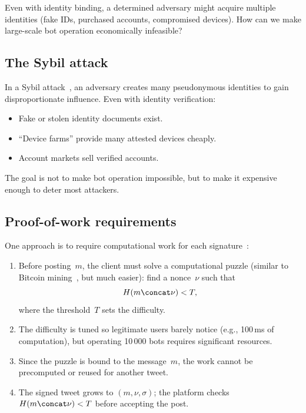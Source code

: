 \begin{exercise}
  Even with identity binding, a determined adversary might acquire multiple 
  identities (fake IDs, purchased accounts, compromised devices).
  How can we make large-scale bot operation economically infeasible?
\end{exercise}

\subsection{The Sybil attack}

In a Sybil attack~\autocite{SybilAttack}, an adversary creates many
pseudonymous identities to gain disproportionate influence.
Even with identity verification:
\begin{itemize}
  \item Fake or stolen identity documents exist.
  \item \enquote{Device farms} provide many attested devices cheaply.
  \item Account markets sell verified accounts.
\end{itemize}

The goal is not to make bot operation impossible, but to make it expensive 
enough to deter most attackers.

\subsection{Proof-of-work requirements}

One approach is to require computational work for each
signature~\autocite{DworkNaor1992pow}:
\begin{enumerate}
  \item Before posting~\(m\), the client must solve a computational
    puzzle (similar to Bitcoin mining~\autocite{Bitcoin}, but much
    easier): find a nonce~\(\nu\) such that
    \[
      H(m \concat \nu) < T,
    \]
    where the threshold~\(T\) sets the difficulty.
  \item The difficulty is tuned so legitimate users barely notice
    (e.g., 100\,ms of computation), but operating 10\,000 bots requires
    significant resources.
  \item Since the puzzle is bound to the message~\(m\), the work cannot
    be precomputed or reused for another tweet.
  \item The signed tweet grows to \((m, \nu, \sigma)\); the platform
    checks \(H(m \concat \nu) < T\) before accepting the post.
\end{enumerate}

